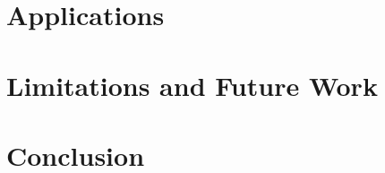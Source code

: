 \documentclass[journal]{IEEEtran}
\begin{document}
\section{Applications}
\label{sec:applications}


\section{Limitations and Future Work}
\label{sec:limitations}


\section{Conclusion}
\label{sec:conclusion}




\end{document}
